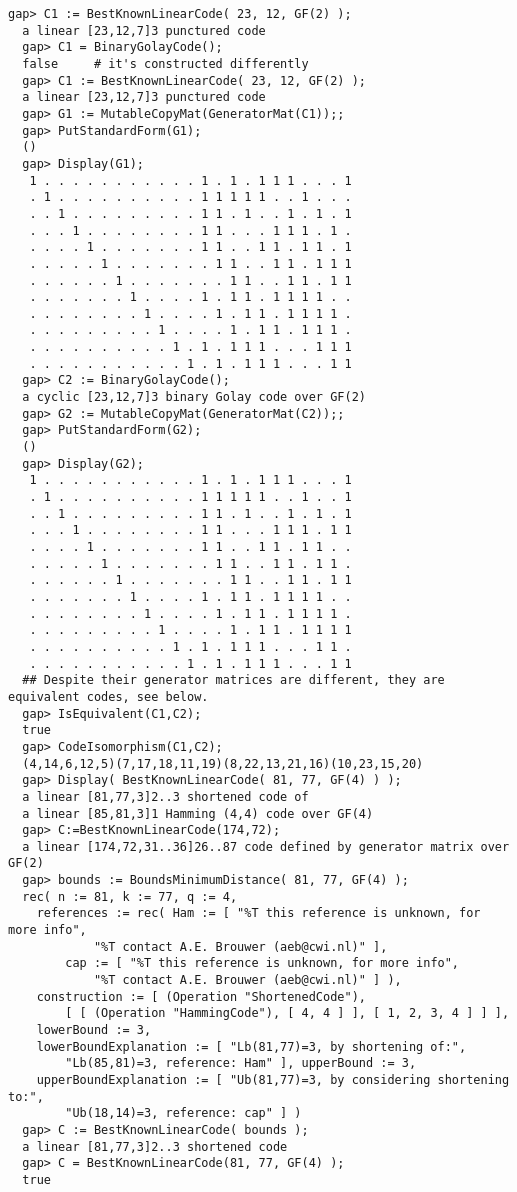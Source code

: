 \documentclass[a4paper,11pt]{report}
\begin{document}
{{ 
\begin{Verbatim}[fontsize=\small,frame=single,label=Example]
  gap> C1 := BestKnownLinearCode( 23, 12, GF(2) );
  a linear [23,12,7]3 punctured code
  gap> C1 = BinaryGolayCode();
  false     # it's constructed differently
  gap> C1 := BestKnownLinearCode( 23, 12, GF(2) );
  a linear [23,12,7]3 punctured code
  gap> G1 := MutableCopyMat(GeneratorMat(C1));;
  gap> PutStandardForm(G1);
  ()
  gap> Display(G1);
   1 . . . . . . . . . . . 1 . 1 . 1 1 1 . . . 1
   . 1 . . . . . . . . . . 1 1 1 1 1 . . 1 . . .
   . . 1 . . . . . . . . . 1 1 . 1 . . 1 . 1 . 1
   . . . 1 . . . . . . . . 1 1 . . . 1 1 1 . 1 .
   . . . . 1 . . . . . . . 1 1 . . 1 1 . 1 1 . 1
   . . . . . 1 . . . . . . . 1 1 . . 1 1 . 1 1 1
   . . . . . . 1 . . . . . . . 1 1 . . 1 1 . 1 1
   . . . . . . . 1 . . . . 1 . 1 1 . 1 1 1 1 . .
   . . . . . . . . 1 . . . . 1 . 1 1 . 1 1 1 1 .
   . . . . . . . . . 1 . . . . 1 . 1 1 . 1 1 1 .
   . . . . . . . . . . 1 . 1 . 1 1 1 . . . 1 1 1
   . . . . . . . . . . . 1 . 1 . 1 1 1 . . . 1 1
  gap> C2 := BinaryGolayCode();
  a cyclic [23,12,7]3 binary Golay code over GF(2)
  gap> G2 := MutableCopyMat(GeneratorMat(C2));;
  gap> PutStandardForm(G2);
  ()
  gap> Display(G2);
   1 . . . . . . . . . . . 1 . 1 . 1 1 1 . . . 1
   . 1 . . . . . . . . . . 1 1 1 1 1 . . 1 . . 1
   . . 1 . . . . . . . . . 1 1 . 1 . . 1 . 1 . 1
   . . . 1 . . . . . . . . 1 1 . . . 1 1 1 . 1 1
   . . . . 1 . . . . . . . 1 1 . . 1 1 . 1 1 . .
   . . . . . 1 . . . . . . . 1 1 . . 1 1 . 1 1 .
   . . . . . . 1 . . . . . . . 1 1 . . 1 1 . 1 1
   . . . . . . . 1 . . . . 1 . 1 1 . 1 1 1 1 . .
   . . . . . . . . 1 . . . . 1 . 1 1 . 1 1 1 1 .
   . . . . . . . . . 1 . . . . 1 . 1 1 . 1 1 1 1
   . . . . . . . . . . 1 . 1 . 1 1 1 . . . 1 1 .
   . . . . . . . . . . . 1 . 1 . 1 1 1 . . . 1 1
  ## Despite their generator matrices are different, they are equivalent codes, see below.
  gap> IsEquivalent(C1,C2);
  true
  gap> CodeIsomorphism(C1,C2);
  (4,14,6,12,5)(7,17,18,11,19)(8,22,13,21,16)(10,23,15,20)
  gap> Display( BestKnownLinearCode( 81, 77, GF(4) ) );
  a linear [81,77,3]2..3 shortened code of
  a linear [85,81,3]1 Hamming (4,4) code over GF(4)
  gap> C:=BestKnownLinearCode(174,72);
  a linear [174,72,31..36]26..87 code defined by generator matrix over GF(2)
  gap> bounds := BoundsMinimumDistance( 81, 77, GF(4) );
  rec( n := 81, k := 77, q := 4, 
    references := rec( Ham := [ "%T this reference is unknown, for more info", 
            "%T contact A.E. Brouwer (aeb@cwi.nl)" ], 
        cap := [ "%T this reference is unknown, for more info", 
            "%T contact A.E. Brouwer (aeb@cwi.nl)" ] ), 
    construction := [ (Operation "ShortenedCode"), 
        [ [ (Operation "HammingCode"), [ 4, 4 ] ], [ 1, 2, 3, 4 ] ] ], 
    lowerBound := 3, 
    lowerBoundExplanation := [ "Lb(81,77)=3, by shortening of:", 
        "Lb(85,81)=3, reference: Ham" ], upperBound := 3, 
    upperBoundExplanation := [ "Ub(81,77)=3, by considering shortening to:", 
        "Ub(18,14)=3, reference: cap" ] )
  gap> C := BestKnownLinearCode( bounds );
  a linear [81,77,3]2..3 shortened code
  gap> C = BestKnownLinearCode(81, 77, GF(4) );
  true
\end{Verbatim}
  }

}
\end{document}
